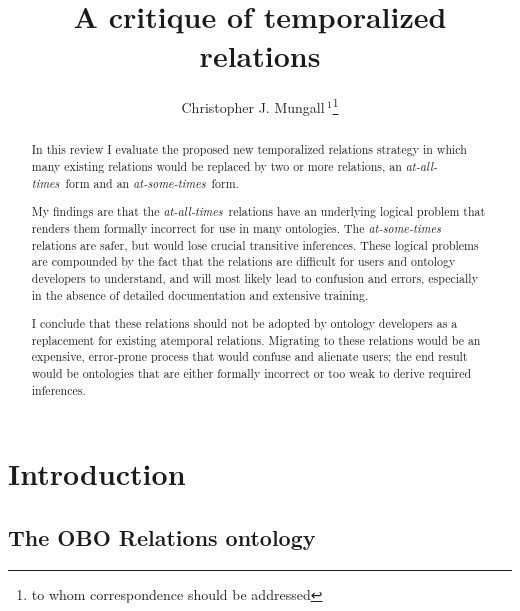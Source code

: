 \documentclass{bioinfo}
\begin{document}

\title{A critique of temporalized relations}

\author{Christopher J. Mungall\,$^{1}$\footnote{to whom correspondence should be addressed}}
\address{$^{1}$Genomics Division, Lawrence Berkeley National Laboratory, MS84R017, 1 Cyclotron Road, Berkeley, CA 94720 USA}

\history{}

\editor{}

\maketitle

\begin{abstract}

  In this review I evaluate the proposed new temporalized relations
  strategy in which many existing relations would be replaced by two
  or more relations, an \emph{at-all-times}\ form and an
  \emph{at-some-times}\ form.

  My findings are that the \emph{at-all-times}\ relations have an
  underlying logical problem that renders them formally incorrect for
  use in many ontologies. The \emph{at-some-times} relations are
  safer, but would lose crucial transitive inferences. These logical
  problems are compounded by the fact that the relations are difficult
  for users and ontology developers to understand, and will most
  likely lead to confusion and errors, especially in the absence of
  detailed documentation and extensive training.

  I conclude that these relations should not be adopted by ontology
  developers as a replacement for existing atemporal
  relations. Migrating to these relations would be an expensive,
  error-prone process that would confuse and alienate users; the end
  result would be ontologies that are either formally incorrect or too
  weak to derive required inferences.

\end{abstract}

\section{Introduction}

\subsection{The OBO Relations ontology}
\end{document}
